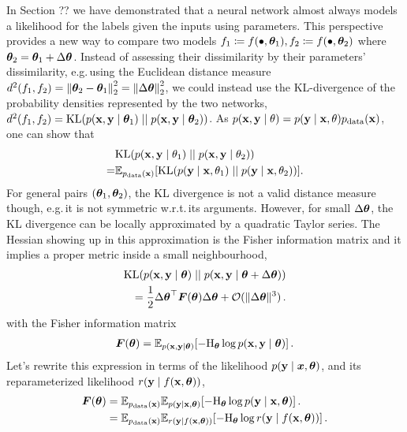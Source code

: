 In Section ??
we have demonstrated that a neural network almost always models a likelihood for the labels given the inputs using parameters.
This perspective provides a new way to compare two models $f_1 \coloneq f(\bullet, {\bm{\theta}}_1), f_2 \coloneq f(\bullet, {\bm{\theta}}_{2})$ where ${\bm{\theta}}_2 = {\bm{\theta}}_1 + \Delta {\bm{\theta}}$.
Instead of assessing their dissimilarity by their parameters' dissimilarity, e.g.\,using the Euclidean distance measure $d^2(f_1, f_2) = \left\lVert {\bm{\theta}}_2 - {\bm{\theta}}_1 \right\rVert_2^2 = \left\lVert \Delta {\bm{\theta}} \right\rVert_2^2$, we could instead use the KL-divergence of the probability densities represented by the two networks, $d^2(f_1, f_2) = \mathrm{KL}(p({\mathbf{x}}, {\mathbf{y}} \mid {\bm{\theta}}_1) \mid\mid p({\mathbf{x}}, {\mathbf{y}} \mid {\bm{\theta}}_2))$.
As $p({\mathbf{x}}, {\mathbf{y}} \mid {\mathbf{\theta}}) = p({\mathbf{y}} \mid {\mathbf{x}}, {\mathbf{\theta}})p_\text{data}({\mathbf{x}})$, one can show that
\begin{align*}
    & \mathrm{KL}(p({\mathbf{x}}, {\mathbf{y}} \mid {\mathbf{\theta}}_1) \mid\mid p({\mathbf{x}}, {\mathbf{y}} \mid {\mathbf{\theta}}_2))                               \\
  = & \mathbb{E}_{p_{\text{data}}({\mathbf{x}})} [\mathrm{KL}(p({\mathbf{y}} \mid {\mathbf{x}}, {\mathbf{\theta}}_1) \mid\mid p({\mathbf{y}} \mid {\mathbf{x}}, {\mathbf{\theta}}_2))].
\end{align*}
For general pairs $({\bm{\theta}}_1, {\bm{\theta}}_2)$, the KL divergence is not a valid distance measure though, e.g.\,it is not symmetric w.r.t.\,its arguments.
However, for small $\Delta {\bm{\theta}}$, the KL divergence can be locally approximated by a quadratic Taylor series.
The Hessian showing up in this approximation is the Fisher information matrix and it implies a proper metric inside a small neighbourhood,
\begin{align*}
  \mathrm{KL}(p({\mathbf{x}}, {\mathbf{y}} \mid {\bm{\theta}}) \mid\mid p({\mathbf{x}}, {\mathbf{y}} \mid {\bm{\theta}} + \Delta {\bm{\theta}}))
  \\
  = \frac{1}{2} {\Delta {\bm{\theta}}}^{\top} {\bm{F}}({\bm{\theta}}) \Delta {\bm{\theta}} + {\mathcal{O}}( \Vert\Delta {\bm{\theta}}\Vert^3)\,.
\end{align*}
with the Fisher information matrix
\begin{align*}
  {\bm{F}}({\bm{\theta}}) = \mathbb{E}_{p({\mathbf{x}}, {\mathbf{y}} \mid {\bm{\theta}})} [-\mathrm{H}_{{\bm{\theta}}} \log p({\mathbf{x}}, {\mathbf{y}} \mid {\bm{\theta}})]\,.
\end{align*}
Let's rewrite this expression in terms of the likelihood $p({\mathbf{y}} \mid {\bm{x}}, {\bm{\theta}})$, and its reparameterized likelihood $r({\mathbf{y}} \mid f({\mathbf{x}}, {\bm{\theta}}))$,
\begin{align*}
  {\bm{F}}({\bm{\theta}})
   & =
  \mathbb{E}_{p_{\text{data}}({\mathbf{x}})}\mathbb{E}_{p({\mathbf{y}} \mid {\mathbf{x}}, {\bm{\theta}})} [-\mathrm{H}_{{\bm{\theta}}} \log p({\mathbf{y}} \mid {\mathbf{x}}, {\bm{\theta}})]\,.
  \\
   & =
  \mathbb{E}_{p_{\text{data}}({\mathbf{x}})}\mathbb{E}_{r({\mathbf{y}} \mid f({\mathbf{x}}, {\bm{\theta}}))} [-\mathrm{H}_{{\bm{\theta}}} \log r({\mathbf{y}} \mid f({\mathbf{x}}, {\bm{\theta}}))]\,.
\end{align*}
